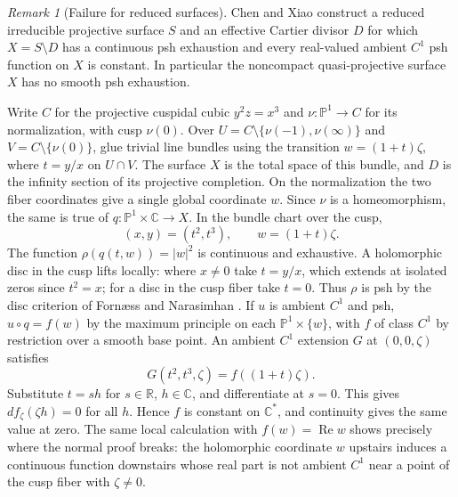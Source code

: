 \documentclass[11pt]{amsart}
\theoremstyle{remark}
\newtheorem{remark}[theorem]{Remark}
\numberwithin{equation}{section}
\newcommand{\R}{\mathbb R}
\newcommand{\C}{\mathbb C}
\begin{document}
\clearpage
\begin{remark}[Failure for reduced surfaces]\label{rem:cusp}
Chen and Xiao \cite[Proposition~5.7, p.~37]{CX} construct a reduced
irreducible projective surface \(S\) and an effective Cartier divisor
\(D\) for which \(X=S\setminus D\) has a continuous psh exhaustion
and every real-valued ambient \(C^1\) psh function on \(X\) is constant.
In particular the noncompact quasi-projective surface \(X\) has no
smooth psh exhaustion.

Write \(C\) for the projective cuspidal cubic \(y^2z=x^3\) and
\(\nu:\mathbb P^1\to C\) for its normalization, with cusp \(\nu(0)\).
Over \(U=C\setminus\{\nu(-1),\nu(\infty)\}\) and
\(V=C\setminus\{\nu(0)\}\), glue trivial line bundles using the
transition \(w=(1+t)\zeta\), where \(t=y/x\) on \(U\cap V\).
The surface \(X\) is the total space of this bundle, and \(D\) is
the infinity section of its projective completion. On the normalization
the two fiber coordinates give a single global coordinate \(w\).
Since \(\nu\) is a homeomorphism, the same is true of
\(q:\mathbb P^1\times\C\to X\). In the bundle chart over the cusp,
\[
 (x,y)=(t^2,t^3),\qquad w=(1+t)\zeta .
\]
The function \(\rho(q(t,w))=|w|^2\) is continuous and exhaustive.
A holomorphic disc in the cusp lifts locally: where \(x\ne0\) take
\(t=y/x\), which extends at isolated zeros since \(t^2=x\); for a
disc in the cusp fiber take \(t=0\). Thus \(\rho\) is psh by the disc
criterion of Forn{\ae}ss and Narasimhan
\cite[Th\'eor\`eme~1.6]{Demailly}. If \(u\) is ambient \(C^1\) and psh, \(u\circ q=f(w)\)
by the maximum principle on each \(\mathbb P^1\times\{w\}\), with
\(f\) of class \(C^1\) by restriction over a smooth base point.
An ambient \(C^1\) extension \(G\) at \((0,0,\zeta)\) satisfies
\[
 G(t^2,t^3,\zeta)=f((1+t)\zeta).
\]
Substitute \(t=sh\) for \(s\in\R\), \(h\in\C\), and differentiate
at \(s=0\). This gives \(df_\zeta(\zeta h)=0\) for all \(h\).
Hence \(f\) is constant on \(\C^*\), and continuity gives the same
value at zero. The same local calculation with \(f(w)=\operatorname{Re}w\)
shows precisely where the normal proof breaks: the holomorphic coordinate
\(w\) upstairs induces a continuous function downstairs whose real part
is not ambient \(C^1\) near a point of the cusp fiber with \(\zeta\ne0\).
\end{remark}
\end{document}
